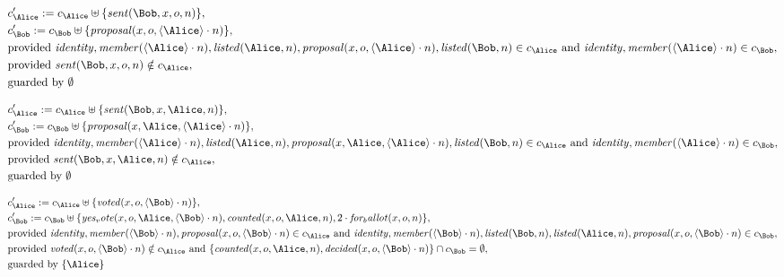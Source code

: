 \begin{align*}
&
c'_
{
\Alice
}
 := 
c_
{
\Alice
}
 \uplus 
\{
\mathit{
sent
}
(
\Bob
,
x
,
o
,
n
)
\}
,\\
&
c'_
{
\Bob
}
 := 
c_
{
\Bob
}
 \uplus 
\{
\mathit{
proposal
}
(
x
,
o
,
\langle
\Alice
\rangle
\cdot
n
)
\}
,\\
&
\text{provided } 
\mathit{
identity
}
,
\mathit{
member
}
(
\langle
\Alice
\rangle
\cdot
n
)
,
\mathit{
listed
}
(
\Alice
,
n
)
,
\mathit{
proposal
}
(
x
,
o
,
\langle
\Alice
\rangle
\cdot
n
)
,
\mathit{
listed
}
(
\Bob
,
n
)
 \in c_
{
\Alice
}
 \text{ and } 
\mathit{
identity
}
,
\mathit{
member
}
(
\langle
\Alice
\rangle
\cdot
n
)
 \in c_
{
\Bob
}
,\\
&
\text{provided } 
\mathit{
sent
}
(
\Bob
,
x
,
o
,
n
)
 \notin c_
{
\Alice
}
,\\
&
\text{guarded by } \emptyset
\end{align*}

\begin{align*}
&
c'_
{
\Alice
}
 := 
c_
{
\Alice
}
 \uplus 
\{
\mathit{
sent
}
(
\Bob
,
x
,
\Alice
,
n
)
\}
,\\
&
c'_
{
\Bob
}
 := 
c_
{
\Bob
}
 \uplus 
\{
\mathit{
proposal
}
(
x
,
\Alice
,
\langle
\Alice
\rangle
\cdot
n
)
\}
,\\
&
\text{provided } 
\mathit{
identity
}
,
\mathit{
member
}
(
\langle
\Alice
\rangle
\cdot
n
)
,
\mathit{
listed
}
(
\Alice
,
n
)
,
\mathit{
proposal
}
(
x
,
\Alice
,
\langle
\Alice
\rangle
\cdot
n
)
,
\mathit{
listed
}
(
\Bob
,
n
)
 \in c_
{
\Alice
}
 \text{ and } 
\mathit{
identity
}
,
\mathit{
member
}
(
\langle
\Alice
\rangle
\cdot
n
)
 \in c_
{
\Bob
}
,\\
&
\text{provided } 
\mathit{
sent
}
(
\Bob
,
x
,
\Alice
,
n
)
 \notin c_
{
\Alice
}
,\\
&
\text{guarded by } \emptyset
\end{align*}

\begin{align*}
&
c'_
{
\Alice
}
 := 
c_
{
\Alice
}
 \uplus 
\{
\mathit{
voted
}
(
x
,
o
,
\langle
\Bob
\rangle
\cdot
n
)
\}
,\\
&
c'_
{
\Bob
}
 := 
c_
{
\Bob
}
 \uplus 
\{
\mathit{
yes_vote
}
(
x
,
o
,
\Alice
,
\langle
\Bob
\rangle
\cdot
n
)
,
\mathit{
counted
}
(
x
,
o
,
\Alice
,
n
)
,
2
\cdot
\mathit{
for_ballot
}
(
x
,
o
,
n
)
\}
,\\
&
\text{provided } 
\mathit{
identity
}
,
\mathit{
member
}
(
\langle
\Bob
\rangle
\cdot
n
)
,
\mathit{
proposal
}
(
x
,
o
,
\langle
\Bob
\rangle
\cdot
n
)
 \in c_
{
\Alice
}
 \text{ and } 
\mathit{
identity
}
,
\mathit{
member
}
(
\langle
\Bob
\rangle
\cdot
n
)
,
\mathit{
listed
}
(
\Bob
,
n
)
,
\mathit{
listed
}
(
\Alice
,
n
)
,
\mathit{
proposal
}
(
x
,
o
,
\langle
\Bob
\rangle
\cdot
n
)
 \in c_
{
\Bob
}
,\\
&
\text{provided } 
\mathit{
voted
}
(
x
,
o
,
\langle
\Bob
\rangle
\cdot
n
)
 \notin c_
{
\Alice
}
 \text{ and } 
\{
\mathit{
counted
}
(
x
,
o
,
\Alice
,
n
)
,
\mathit{
decided
}
(
x
,
o
,
\langle
\Bob
\rangle
\cdot
n
)
\}
 \cap c_
{
\Bob
}
 = \emptyset
,\\
&
\text{guarded by } \{
\Alice
\}
\end{align*}

